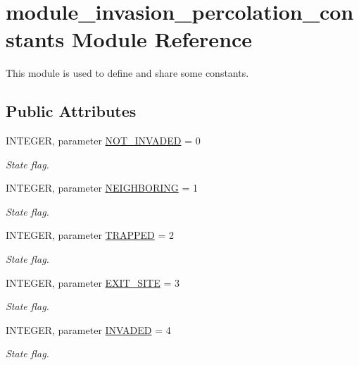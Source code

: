 \hypertarget{classmodule__invasion__percolation__constants}{
\section{module\-\_\-invasion\-\_\-percolation\-\_\-constants \-Module \-Reference}
\label{classmodule__invasion__percolation__constants}
}


\-This module is used to define and share some constants.  


\subsection*{\-Public \-Attributes}
\begin{DoxyCompactItemize}
\item 
\-I\-N\-T\-E\-G\-E\-R, parameter \hyperlink{classmodule__invasion__percolation__constants_a7fecbd7b24fc856a8381da245555eb59}{\-N\-O\-T\-\_\-\-I\-N\-V\-A\-D\-E\-D} = 0
\begin{DoxyCompactList}\small\item\em \-State flag. \end{DoxyCompactList}\item 
\-I\-N\-T\-E\-G\-E\-R, parameter \hyperlink{classmodule__invasion__percolation__constants_ab5922cbf1e44fb051d2e4f53bd488a5b}{\-N\-E\-I\-G\-H\-B\-O\-R\-I\-N\-G} = 1
\begin{DoxyCompactList}\small\item\em \-State flag. \end{DoxyCompactList}\item 
\-I\-N\-T\-E\-G\-E\-R, parameter \hyperlink{classmodule__invasion__percolation__constants_ae0a7d5e563590985dcfc6ef48fb2680c}{\-T\-R\-A\-P\-P\-E\-D} = 2
\begin{DoxyCompactList}\small\item\em \-State flag. \end{DoxyCompactList}\item 
\-I\-N\-T\-E\-G\-E\-R, parameter \hyperlink{classmodule__invasion__percolation__constants_a91f942526d67d154ae5ec76baccbf12e}{\-E\-X\-I\-T\-\_\-\-S\-I\-T\-E} = 3
\begin{DoxyCompactList}\small\item\em \-State flag. \end{DoxyCompactList}\item 
\-I\-N\-T\-E\-G\-E\-R, parameter \hyperlink{classmodule__invasion__percolation__constants_a60e99c2c35344e991e5955bf347d2516}{\-I\-N\-V\-A\-D\-E\-D} = 4
\begin{DoxyCompactList}\small\item\em \-State flag. \end{DoxyCompactList}\end{DoxyCompactItemize}


